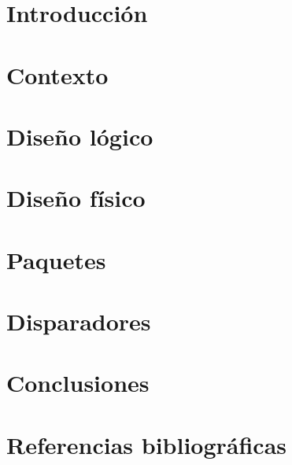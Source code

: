 \part{Introducción}


\newpage
\part{Contexto}


\newpage
\part{Diseño lógico}


\newpage
\part{Diseño físico}


\newpage
\part{Paquetes}


\newpage
\part{Disparadores}


\newpage
\part{Conclusiones}


\newpage
\part{Referencias bibliográficas}
